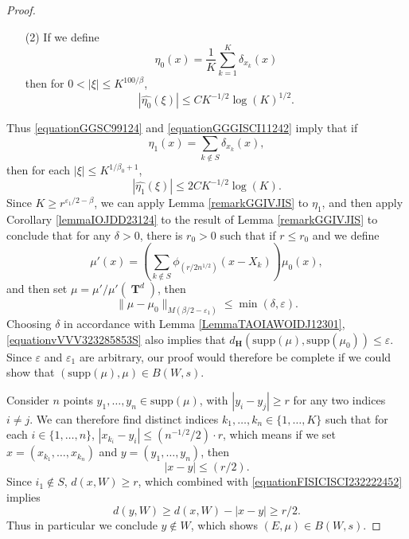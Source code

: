 \documentclass[12pt,reqno]{article}
\numberwithin{equation}{section}
\DeclareMathOperator{\TT}{\mathbf{T}}
\numberwithin{theorem}{section}
\begin{document}
\begin{proof}
\begin{itemize}
        \item[(2)] If we define
        \[ \eta_0(x) = \frac{1}{K} \sum_{k = 1}^K \delta_{x_k}(x) \]
        then for $0 < |\xi| \leq K^{100/\beta}$,
        \begin{equation} \label{equationGGGISCI11242}
            |\widehat{\eta_0}(\xi)| \leq C K^{-1/2} \log(K)^{1/2}.
        \end{equation}
    \end{itemize}
    Thus \eqref{equationGGSC99124} and \eqref{equationGGGISCI11242} imply that if
    \[ \eta_1(x) = \sum_{k \not \in S} \delta_{x_k}(x), \]
    then for each $|\xi| \leq K^{1/\beta_0 + 1}$,
    \begin{equation} \label{equationGGSCSIAXAXXXSFGG}
        |\widehat{\eta_1}(\xi)| \leq 2C K^{-1/2} \log(K).
    \end{equation}
    Since $K \geq r^{\varepsilon_1/2 - \beta}$, we can apply Lemma \ref{remarkGGIVJIS} to $\eta_1$, and then apply Corollary \ref{lemmaIOJDD23124} to the result of Lemma \ref{remarkGGIVJIS} to conclude that for any $\delta > 0$, there is $r_0 > 0$ %
    such that if $r \leq r_0$ and we define
    \[ \mu'(x) = \left( \sum_{k \not \in S} \phi_{(r/2n^{1/2})}(x - X_k) \right) \mu_0(x), \]
    and then set $\mu = \mu' / \mu'(\TT^d)$, then
    \begin{equation} \label{equationvVVV323285853S}
        \| \mu - \mu_0 \|_{M(\beta/2 - \varepsilon_1)} \leq \min(\delta,\varepsilon).
    \end{equation}
    Choosing $\delta$ in accordance with Lemma \ref{LemmaTAOIAWOIDJ12301}, \eqref{equationvVVV323285853S} also implies that $d_\mathbf{H}(\text{supp}(\mu), \text{supp}(\mu_0)) \leq \varepsilon$. Since $\varepsilon$ and $\varepsilon_1$ are arbitrary, our proof would therefore be complete if we could show that $(\text{supp}(\mu),\mu) \in B(W,s)$.

    Consider $n$ points $y_1, \dots, y_n \in \text{supp}(\mu)$, with $|y_i - y_j| \geq r$ for any two indices $i \neq j$. We can therefore find distinct indices $k_1, \dots, k_n \in \{ 1, \dots, K \}$ such that for each $i \in \{ 1, \dots, n \}$, $|x_{k_i} - y_i| \leq (n^{-1/2}/2) \cdot r$, which means if we set $x = (x_{k_1}, \dots, x_{k_n})$ and $y = (y_1, \dots, y_n)$, then
    \begin{equation} \label{equationFISICISCI232222452}
        |x - y| \leq (r/2).
    \end{equation}
    Since $i_1 \not \in S$, $d(x,W) \geq r$, which combined with \eqref{equationFISICISCI232222452} implies
    \begin{equation} \label{equationSICSICI}
        d(y,W) \geq d(x,W) - |x - y| \geq r/2.
    \end{equation}
    Thus in particular we conclude $y \not \in W$, which shows $(E,\mu) \in B(W,s)$.
\end{proof}
\end{document}
